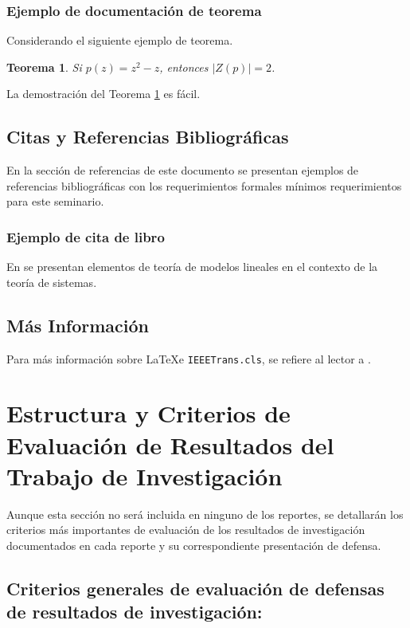 \documentclass[peerreview]{IEEEtran}
\newtheorem{theorem}{Teorema}
\begin{document}
\subsubsection*{Ejemplo de documentaci\'on de teorema} Considerando el siguiente ejemplo de teorema.

\begin{theorem}\label{thm:teorema-ejemplo}
Si $p(z)=z^2-z$, entonces $|Z(p)|=2$.
\end{theorem}

La demostraci\'on del Teorema \ref{thm:teorema-ejemplo} es f\'acil.

\subsection{Citas y Referencias Bibliogr\'aficas} En la secci\'on de referencias de este documento se presentan ejemplos de referencias bibliogr\'aficas con los requerimientos formales m\'inimos requerimientos para este seminario.

\subsubsection*{Ejemplo de cita de libro} En \cite{Linear_Models_book} se presentan elementos de teor\'ia de modelos lineales en el contexto de la teor\'ia de sistemas.

\subsection{M\'as Informaci\'on} Para m\'as informaci\'on sobre \LaTeX e {\tt IEEETrans.cls}, se refiere al lector a \cite{kopka_1999,IEEETran}.

\section{Estructura y Criterios de Evaluaci\'on de Resultados del Trabajo de Investigaci\'on} \label{sec:criterio}
Aunque esta secci\'on no ser\'a incluida en ninguno de los reportes, se detallar\'an los criterios m\'as importantes de evaluaci\'on de los resultados de investigaci\'on documentados en cada reporte y su correspondiente presentaci\'on de defensa.

\subsection{Criterios generales de evaluaci\'on de defensas de resultados de investigaci\'on:}
\end{document}
